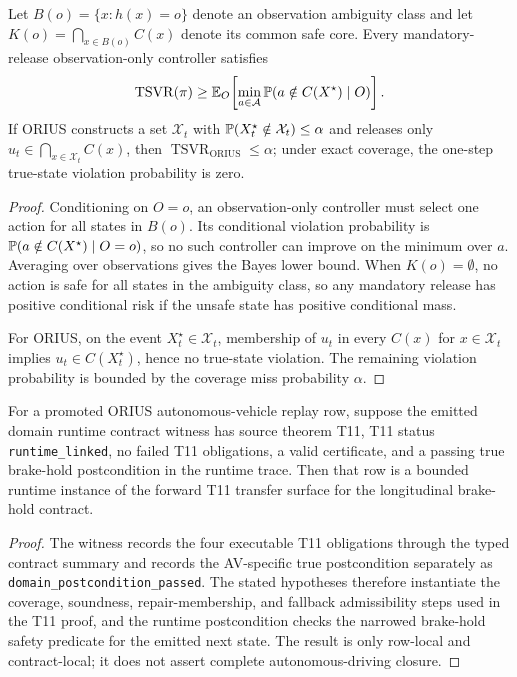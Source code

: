 \begin{corollary}
Let $B(o)=\{x:h(x)=o\}$ denote an observation ambiguity class and let
$K(o)=\bigcap_{x\in B(o)}C(x)$ denote its common safe core.  Every
mandatory-release observation-only controller satisfies
\[
  \operatorname{TSVR}(\pi)
  \ge
  \mathbb{E}_{O}\!\left[
    \min_{a\in\mathcal{A}}
    \operatorname{\mathbb{P}}(a\notin C(X^\star)\mid O)
  \right].
\]
If ORIUS constructs a set $\mathcal{X}_t$ with
$\operatorname{\mathbb{P}}(X_t^\star\notin\mathcal{X}_t)\le\alpha$ and releases only
$u_t\in\bigcap_{x\in\mathcal{X}_t}C(x)$, then
$\operatorname{TSVR}_{\mathrm{ORIUS}}\le\alpha$; under exact coverage, the
one-step true-state violation probability is zero.
\end{corollary}

\begin{proof}
Conditioning on $O=o$, an observation-only controller must select one action
for all states in $B(o)$.  Its conditional violation probability is
$\operatorname{\mathbb{P}}(a\notin C(X^\star)\mid O=o)$, so no such controller can improve on the
minimum over $a$.  Averaging over observations gives the Bayes lower bound.
When $K(o)=\emptyset$, no action is safe for all states in the ambiguity
class, so any mandatory release has positive conditional risk if the unsafe
state has positive conditional mass.

For ORIUS, on the event $X_t^\star\in\mathcal{X}_t$, membership of $u_t$ in
every $C(x)$ for $x\in\mathcal{X}_t$ implies $u_t\in C(X_t^\star)$, hence no
true-state violation.  The remaining violation probability is bounded by the
coverage miss probability $\alpha$.
\end{proof}

\begin{lemma}
For a promoted ORIUS autonomous-vehicle replay row, suppose the emitted
domain runtime contract witness has source theorem T11, T11 status
\texttt{runtime\_linked}, no failed T11 obligations, a valid certificate,
and a passing true brake-hold postcondition in the runtime trace.  Then that
row is a bounded runtime instance of the forward T11 transfer surface for the
longitudinal brake-hold contract.
\end{lemma}

\begin{proof}
The witness records the four executable T11 obligations through the typed
contract summary and records the AV-specific true postcondition separately
as \texttt{domain\_postcondition\_passed}.  The stated hypotheses therefore
instantiate the coverage, soundness, repair-membership, and fallback
admissibility steps used in the T11 proof, and the runtime postcondition
checks the narrowed brake-hold safety predicate for the emitted next state.
The result is only row-local and contract-local; it does not assert complete
autonomous-driving closure.
\end{proof}

